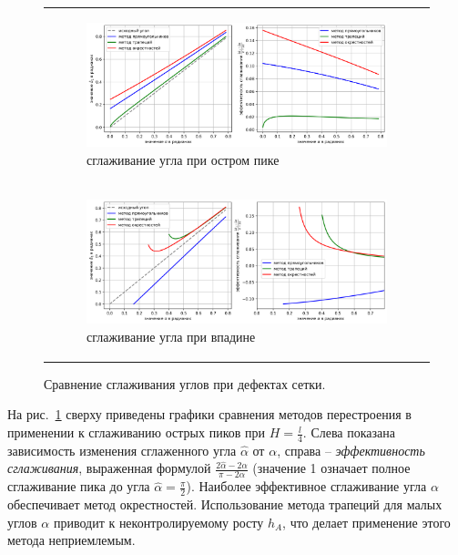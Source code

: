 \documentclass[a4paper,14pt]{extarticle}                     %
\theoremstyle{plain}                                         %
\begin{document}
\begin{figure}[ht]
\centering
\begin{tabular}{l}
\begin{subfigure}{0.8\textwidth}\centering\includegraphics[width=1.0\columnwidth]{fig/2dr_peak_methods_chart.png}\caption{сглаживание угла при остром пике}\end{subfigure} \\
\begin{subfigure}{0.8\textwidth}\centering\includegraphics[width=1.0\columnwidth]{fig/2dr_cavern_methods_chart.png}\caption{сглаживание угла при впадине}\end{subfigure}
\end{tabular}
\singlespacing
\caption{Сравнение сглаживания углов при дефектах сетки.}
\label{fig:smooth_2d}
\end{figure}

На рис.~\ref{fig:smooth_2d} сверху приведены графики сравнения методов перестроения в применении к сглаживанию острых пиков при $H = \frac{l}{4}$.
Слева показана зависимость изменения сглаженного угла $\hat{\alpha}$ от $\alpha$, справа -- \textit{эффективность сглаживания}, выраженная формулой $\frac{2 \hat{\alpha} - 2 \alpha}{\pi - 2 \alpha}$ (значение 1 означает полное сглаживание пика до угла $\hat{\alpha} = \frac{\pi}{2}$).
Наиболее эффективное сглаживание угла $\alpha$ обеспечивает метод окрестностей.
Использование метода трапеций для малых углов $\alpha$ приводит к неконтролируемому росту $h_A$, что делает применение этого метода неприемлемым.
\end{document}
